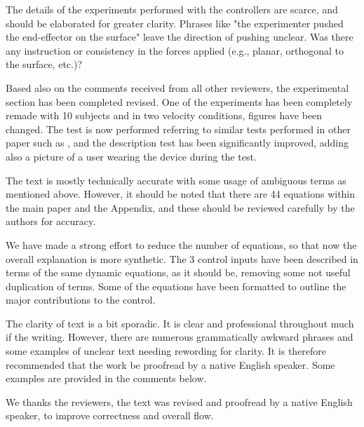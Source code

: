 
\begin{point}
The details of the experiments performed with the controllers are
scarce, and should be elaborated for greater clarity. Phrases like "the
experimenter pushed the end-effector on the surface" leave the
direction of pushing unclear. Was there any instruction or consistency
in the forces applied (e.g., planar, orthogonal to the surface, etc.)?
\end{point}
\begin{reply}
	Based also on the comments received from all other reviewers, the experimental section has been completed revised. One of the experiments has been completely remade with 10 subjects and in two velocity conditions, figures have been changed.
	The test is now performed referring to similar tests performed in other paper such as  \cite{just2018exoskeleton}, and the description test has been significantly improved, adding also a picture of a user wearing the device during the test.
\end{reply}

\begin{point}
The text is mostly technically accurate with some usage of ambiguous
terms as mentioned above. However, it should be noted that there are 44
equations within the main paper and the Appendix, and these should be
reviewed carefully by the authors for accuracy. 
\end{point}
\begin{reply}
We have made  a strong effort to reduce the number of equations, so that now the overall explanation is more synthetic. The 3 control inputs have been described in terms of the same dynamic equations, as it should be, removing some not useful duplication of terms. Some of the equations have been formatted to outline the major contributions to the control. 
\end{reply}

\begin{point}
The clarity of text is a bit sporadic. It is clear and professional
throughout much if the writing. However, there are numerous
grammatically awkward phrases and some examples of unclear text needing
rewording for clarity. It is therefore recommended that the work be
proofread by a native English speaker.  Some examples are provided in the comments below.
\end{point}
\begin{reply}
We thanks the reviewers, the text was revised and proofread by a native English speaker, to improve correctness and overall flow.
\end{reply}
%

